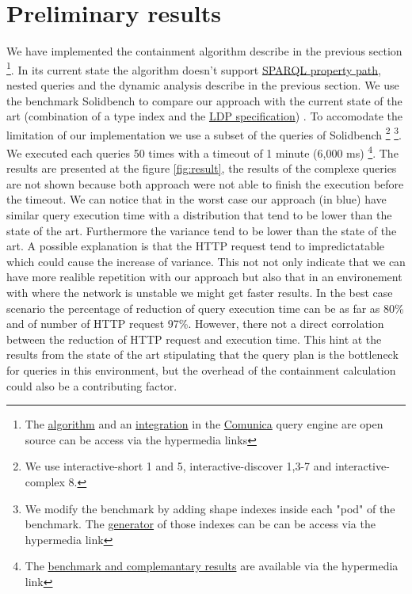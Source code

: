 \section{Preliminary results}
We have implemented the containment algorithm describe in the previous section 
\footnote{The \href{https://github.com/constraintAutomaton/query-shape-detection}{algorithm} and an 
\href{https://github.com/constraintAutomaton/comunica-feature-link-traversal/tree/feature/shapeIndex}{integration} 
in the \href{https://github.com/comunica/comunica}{Comunica} query engine are open source can be access via the hypermedia links}.
In its current state the algorithm doesn't support \href{https://www.w3.org/TR/sparql11-query/#propertypaths}{SPARQL property path}, nested queries
and the dynamic analysis describe in the previous section. 
We use the benchmark Solidbench \cite{Taelman2023} to compare our approach with the current state of the art 
(combination of a type index and the \href{https://www.w3.org/TR/ldp/}{LDP specification}) \cite{Taelman2023}.
To accomodate the limitation of our implementation we use a subset of the queries of Solidbench
\footnote{ We use interactive-short 1 and 5, interactive-discover 1,3-7 and interactive-complex 8.}
\footnote{We modify the benchmark by adding shape indexes inside each "pod" of the benchmark.
The \href{https://github.com/constraintAutomaton/rdf-dataset-fragmenter.js/tree/feature/shapeIndex}{generator} of those indexes can be  can be access via the hypermedia link
}.
We executed each queries 50 times with a timeout of 1 minute (6,000 ms) 
\footnote{ \label{foot:complement}The \href{https://github.com/constraintAutomaton/amw_shape_index_results}{benchmark and complemantary results} are available via the hypermedia link}.
The results are presented at the figure \ref{fig:result}, the results of the complexe queries are not shown because both approach 
were not able to finish the execution before the timeout.
We can notice that in the worst case our approach (in blue) have similar query execution time with a distribution that tend to be
lower than the state of the art. Furthermore the variance tend to be lower than the state of the art. 
A possible explanation is that the HTTP request tend to impredictatable which could cause the increase of variance.
This not not only indicate that we can have more realible repetition with our approach but also that in an
environement with where the network is unstable we might get faster results.
In the best case scenario the percentage of reduction of query execution time can be as far as 80\% and of number of HTTP request
97\%. However, there not a direct corrolation between the reduction of HTTP request and execution time.
This hint at the results from the state of the art \cite{Taelman2023} stipulating that the query plan is the bottleneck for queries in this environment,
but the overhead of the containment calculation could also be a contributing factor.

